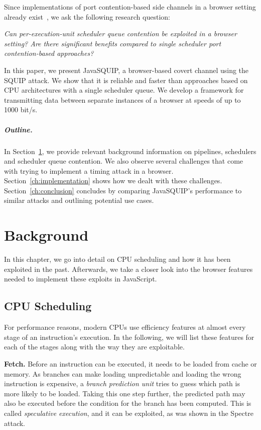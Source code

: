 \documentclass[11pt,
  titlepage=false,
]{scrreprt}
\begin{document}
Since implementations of port contention-based side channels in a browser setting already exist~\cite{Rokicki2022webport}, we ask the following research question:

\textit{Can per-execution-unit scheduler queue contention be exploited in a browser setting? Are there significant benefits compared to single scheduler port contention-based approaches?}

In this paper, we present JavaSQUIP, a browser-based covert channel using the SQUIP attack.
We show that it is reliable and faster than approaches based on CPU architectures with a single scheduler queue.
We develop a framework for transmitting data between separate instances of a browser at speeds of up to 1000 bit/s.

\paragraph{Outline.}
In Section~\ref{ch:background}, we provide relevant background information on pipelines, schedulers and scheduler queue contention.
We also observe several challenges that come with trying to implement a timing attack in a browser.
Section~\ref{ch:implementation} shows how we dealt with these challenges.
Section~\ref{ch:conclusion} concludes by comparing JavaSQUIP's performance to similar attacks and outlining potential use cases.



\chapter{Background}
\label{ch:background}

In this chapter, we go into detail on CPU scheduling and how it has been exploited in the past.
Afterwards, we take a closer look into the browser features needed to implement these exploits in JavaScript.

\section{CPU Scheduling}
\label{sec:cpuschedulers}
For performance reasons, modern CPUs use efficiency features at almost every stage of an instruction's execution.
In the following, we will list these features for each of the stages along with the way they are exploitable.

\textbf{Fetch.}
Before an instruction can be executed, it needs to be loaded from cache or memory.
As branches can make loading unpredictable and loading the wrong instruction is expensive, a \textit{branch prediction unit} tries to guess which path is more likely to be loaded.
Taking this one step further, the predicted path may also be executed before the condition for the branch has been computed.
This is called \textit{speculative execution}\cite{AMD2020OptimizationEPYC7002}, and it can be exploited, as was shown in the Spectre~\cite{spKocherHFGGHHLM019} attack.
\end{document}
